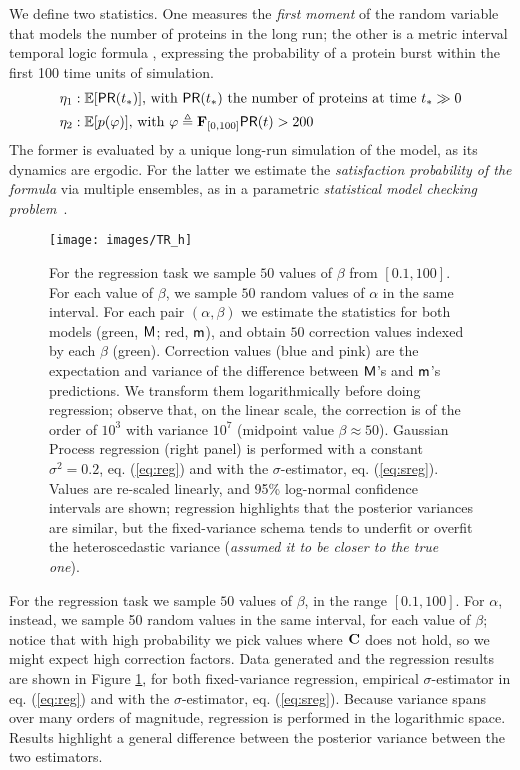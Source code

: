 \documentclass[runningheads,a4paper]{llncs}
\newcommand{\bM}{{\sf{M}}}
\newcommand{\bm}{{\sf{m}}}
\newcommand{\tstat}{\eta} %
\newcommand{\PR}{{{\sf{PR}}}}
\newcommand{\COND}{{{\bf  C}}}
\begin{document}
We define  two statistics. One measures  the {\em first  moment} of the random variable that models the number of proteins in the long run; the other is a metric interval temporal logic formula \cite{alur1996}, expressing the probability of a protein burst  within the first 100 time units of simulation. 
\begin{align} \label{eq:stat-PTN}
\tstat_1 &: \mathbb{E}[\PR(t_\ast)]  \text{, with }  \PR(t_\ast) \text{ the number of proteins at time } t_\ast \gg 0 \\
\tstat_2 &: \mathbb{E}[p(\varphi)]  \text{, with }  \varphi \triangleq \eventually{0}{100} \PR(t) > 200
\end{align}
The former is evaluated by a unique long-run simulation of the model, as its dynamics are ergodic. For the latter we estimate the {\em satisfaction probability of the formula} via multiple ensembles, as in a parametric {\em statistical model checking problem}~\cite{smoothed}.


\begin{figure}[t]
\texttt{[image: images/TR\_h]}
\caption{For the regression task we sample $50$ values of $\beta$ from $[0.1, 100]$. For each value of $\beta$,  we sample $50$ random values of $\alpha$ in the same interval. For each pair $(\alpha, \beta)$ we estimate the statistics for both models (green, $\bM$; red, $\bm$), and obtain $50$ correction values indexed by each $\beta$ (green).
Correction values (blue and pink) are  the expectation and variance of the difference between $\bM$'s and $\bm$'s predictions. We  transform them logarithmically before doing regression; observe that, on the linear scale, the correction is of the order of $10^3$ with variance $10^7$  (midpoint value $\beta \approx 50$). Gaussian Process regression (right panel) is performed with a constant $\sigma^2=0.2$, eq. (\ref{eq:reg}) and with the  $\sigma$-estimator, eq. (\ref{eq:sreg}). Values are re-scaled linearly, and 95\% log-normal confidence intervals are shown; regression highlights that  the posterior variances are similar, but  the fixed-variance schema tends to underfit or overfit the heteroscedastic variance ({\em assumed it to be closer to the true one}).
}
\label{fig:TR-prot}
\end{figure}

For the regression task we sample $50$ values of $\beta$, in the range $[0.1, 100]$. For $\alpha$, instead, we sample 50 random values in the same interval, for each value of $\beta$; notice that with high probability we pick values where $\COND{}$ does not hold, so we might expect high correction factors.  Data generated and the regression results are shown in Figure \ref{fig:TR-prot}, for both fixed-variance regression, empirical $\sigma$-estimator in eq. (\ref{eq:reg}) and with the  $\sigma$-estimator, eq. (\ref{eq:sreg}). Because variance spans over many orders of magnitude, regression is performed in the logarithmic space. Results highlight a general difference between the posterior variance between the two estimators.
\end{document}
